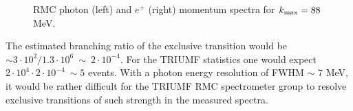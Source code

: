 \documentclass[12pt]{article}
\newcommand {\kmax}      {k_{\rm max}}
\begin{document}
\begin{figure}
  \hspace*{-1.3cm}%
  \caption {
    \label{fig:rmc_photon_and_positron_spectra}
    RMC photon (left) and $e^+$ (right) momentum spectra for $\kmax = 88$ MeV.
  }
\end{figure}


The estimated branching ratio of the exclusive transition would be 
$\sim 3\cdot 10^2/1.3\cdot 10^6 ~ \sim ~ 2\cdot 10^{-4}$. For the TRIUMF statistics one would expect
$2\cdot 10^4\cdot 2\cdot 10^{-4} ~\sim 5$ events. With a photon energy resolution of FWHM $\sim$ 7 MeV,
it would be rather difficult for the TRIUMF RMC spectrometer group to resolve exclusive
transitions of such strength in the measured spectra. 


\newpage
\end{document}
